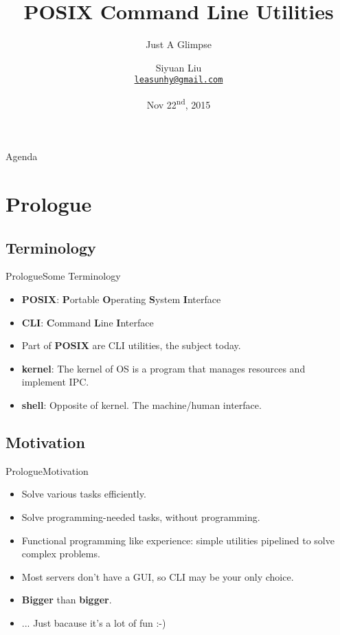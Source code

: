 \documentclass[aspectratio=169]{beamer}
\title{POSIX Command Line Utilities}
\subtitle{Just A Glimpse}
\author[Siyuan Liu]{Siyuan Liu\\\href{mailto:leasunhy@gmail.com}{{\tt leasunhy@gmail.com}}}
\date{Nov 22\textsuperscript{nd}, 2015}
\institute[
    Microsoft Student Technology Club\\
    Sun Yat-sen University
]{
    Microsoft Student Technology Club\\
    Sun Yat-sen University
}
\begin{document}
{\aauwavesbg
\begin{frame}
    \setcounter{tocdepth}{1}
    \titlepage
\end{frame}
}

\begin{frame}{Agenda}{}
\tableofcontents
\end{frame}


\section{Prologue}\label{prologue}

\subsection{Terminology}
\begin{frame}{Prologue}{Some Terminology}

\begin{itemize}[<+->]
\item
  {\bf POSIX}: \textbf{P}ortable \textbf{O}perating \textbf{S}ystem \textbf{I}nterface
\item
  {\bf CLI}: \textbf{C}ommand \textbf{L}ine \textbf{I}nterface
\item
  Part of \textbf{POSIX} are CLI utilities, the subject today.
\item
  {\bf kernel}: The kernel of OS is a program that manages resources and implement IPC.
\item
  {\bf shell}: Opposite of kernel. The machine/human interface.
\end{itemize}

\end{frame}

\subsection{Motivation}
\begin{frame}{Prologue}{Motivation}

\begin{itemize}[<+->]
\item
  Solve various tasks efficiently.
\item
  Solve programming-needed tasks, without programming.
\item
  Functional programming like experience: simple utilities pipelined to
  solve complex problems.
\item
  Most servers don't have a GUI, so CLI may be your only choice.
\item
  \textbf{Bigger} than \textbf{bigger}.
\item
  ... Just bacause it's a lot of fun :-)
\end{itemize}

\end{frame}
\end{document}
